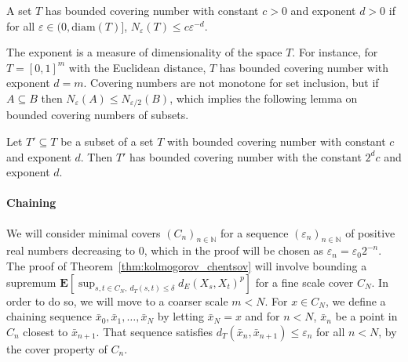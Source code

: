 \documentclass[lean]{Draft}
\makeatletter
\newcommand\leanlink{\begingroup\catcode`\#=12\relax\@leanlink}
\newcommand\@leanlink[2]{\endgroup
\href{#1}
{\texttt{\detokenize{#2}}}}
\newcommand{\docs}[1]{%
\leanlink{https://remydegenne.github.io/brownian-motion/docs/find/?pattern=#1\#doc}
{#1}}
\makeatother
\begin{document}
\begin{definition}[\docs{HasBoundedInternalCoveringNumber}]\label{def:bounded_covering_number}
A set $T$ has bounded covering number with constant $c > 0$ and exponent $d > 0$ if for all $\varepsilon \in (0, \mathrm{diam}(T)]$, $N_\varepsilon(T) \le c \varepsilon^{-d}$.
\end{definition}

The exponent is a measure of dimensionality of the space $T$.
For instance, for $T = [0,1]^m$ with the Euclidean distance, $T$ has bounded covering number with exponent $d = m$.
Covering numbers are not monotone for set inclusion, but if $A \subseteq B$ then $N_\varepsilon(A) \le N_{\varepsilon/2}(B)$, which implies the following lemma on bounded covering numbers of subsets.

\begin{lemma}[\docs{HasBoundedInternalCoveringNumber.subset}]\label{lem:covering_number_subset}
Let $T' \subseteq T$ be a subset of a set $T$ with bounded covering number with constant $c$ and exponent $d$.
Then $T'$ has bounded covering number with the constant $2^d c$ and exponent $d$.
\end{lemma}


\paragraph{Chaining}

We will consider minimal covers $(C_n)_{n \in \mathbb{N}}$ for a sequence $(\varepsilon_n)_{n \in \mathbb{N}}$ of positive real numbers decreasing to $0$, which in the proof will be chosen as $\varepsilon_n = \varepsilon_0 2^{-n}$.
The proof of Theorem~\ref{thm:kolmogorov_chentsov} will involve bounding a supremum $\mathbf{E}\left[\sup_{s, t \in C_N, \: d_T(s, t) \le \delta}d_E(X_s, X_t)^p\right]$ for a fine scale cover $C_N$.
In order to do so, we will move to a coarser scale $m < N$.
For $x \in C_N$, we define a chaining sequence $\bar{x}_0, \bar{x}_1, \ldots, \bar{x}_N$ by letting $\bar{x}_N = x$ and for $n < N$, $\bar{x}_n$ be a point in $C_n$ closest to $\bar{x}_{n+1}$.
That sequence satisfies $d_T(\bar{x}_n, \bar{x}_{n+1}) \le \varepsilon_n$ for all $n < N$, by the cover property of $C_n$.
\end{document}
